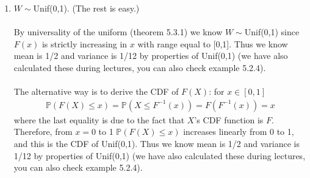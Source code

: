 \begin{exercise}[BH.5.55]
\begin{solution}
\begin{enumerate}
    	\item $W\sim$Unif(0,1). (The rest is easy.)\\~\\
    	By universality of the uniform (theorem 5.3.1) we know $W\sim $Unif(0,1) since $F(x)$ is strictly increasing in $x$ with range equal to [0,1]. Thus we know mean is 1/2 and variance is 1/12 by properties of Unif(0,1) (we have also calculated these during lectures, you can also check example 5.2.4).\\~\\
    	The alternative way is to derive the CDF of $F(X)$:
    	for $x\in [0,1]$
    	\begin{align*}
    		\mathbb{P}(F(X)\leq x) = \mathbb{P}(X\leq F^{-1}(x)) =F\left( F^{-1}(x)\right) = x
    	\end{align*}
    	where the last equality is due to the fact  that $X$'s CDF function is $F$. Therefore, from $x=0$ to 1 $	\mathbb{P}(F(X)\leq x)$ increases linearly from 0 to 1, and this is the CDF of Unif(0,1). Thus we know mean is 1/2 and variance is 1/12 by properties of Unif(0,1) (we have also calculated these during lectures, you can also check example 5.2.4).
	\end{enumerate}
\end{solution}
\end{exercise}


